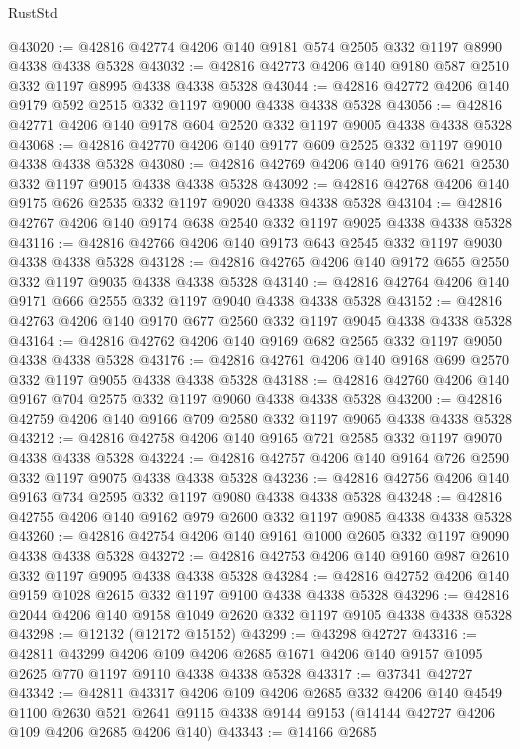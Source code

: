 \begin{lexlean}{RustStd}
\begin{coremodule}
{\begin{coremodule}
{{{{{{{{{{{{{{{{{{{{{{{{{{{{{{{{{{{{{{{{{{{{{{{{{{@43020 := @42816 @42774 @4206 @140 @9181 @574 @2505 @332 @1197 @8990 @4338 @4338 @5328
@43032 := @42816 @42773 @4206 @140 @9180 @587 @2510 @332 @1197 @8995 @4338 @4338 @5328
@43044 := @42816 @42772 @4206 @140 @9179 @592 @2515 @332 @1197 @9000 @4338 @4338 @5328
@43056 := @42816 @42771 @4206 @140 @9178 @604 @2520 @332 @1197 @9005 @4338 @4338 @5328
@43068 := @42816 @42770 @4206 @140 @9177 @609 @2525 @332 @1197 @9010 @4338 @4338 @5328
@43080 := @42816 @42769 @4206 @140 @9176 @621 @2530 @332 @1197 @9015 @4338 @4338 @5328
@43092 := @42816 @42768 @4206 @140 @9175 @626 @2535 @332 @1197 @9020 @4338 @4338 @5328
@43104 := @42816 @42767 @4206 @140 @9174 @638 @2540 @332 @1197 @9025 @4338 @4338 @5328
@43116 := @42816 @42766 @4206 @140 @9173 @643 @2545 @332 @1197 @9030 @4338 @4338 @5328
@43128 := @42816 @42765 @4206 @140 @9172 @655 @2550 @332 @1197 @9035 @4338 @4338 @5328
@43140 := @42816 @42764 @4206 @140 @9171 @666 @2555 @332 @1197 @9040 @4338 @4338 @5328
@43152 := @42816 @42763 @4206 @140 @9170 @677 @2560 @332 @1197 @9045 @4338 @4338 @5328
@43164 := @42816 @42762 @4206 @140 @9169 @682 @2565 @332 @1197 @9050 @4338 @4338 @5328
@43176 := @42816 @42761 @4206 @140 @9168 @699 @2570 @332 @1197 @9055 @4338 @4338 @5328
@43188 := @42816 @42760 @4206 @140 @9167 @704 @2575 @332 @1197 @9060 @4338 @4338 @5328
@43200 := @42816 @42759 @4206 @140 @9166 @709 @2580 @332 @1197 @9065 @4338 @4338 @5328
@43212 := @42816 @42758 @4206 @140 @9165 @721 @2585 @332 @1197 @9070 @4338 @4338 @5328
@43224 := @42816 @42757 @4206 @140 @9164 @726 @2590 @332 @1197 @9075 @4338 @4338 @5328
@43236 := @42816 @42756 @4206 @140 @9163 @734 @2595 @332 @1197 @9080 @4338 @4338 @5328
@43248 := @42816 @42755 @4206 @140 @9162 @979 @2600 @332 @1197 @9085 @4338 @4338 @5328
@43260 := @42816 @42754 @4206 @140 @9161 @1000 @2605 @332 @1197 @9090 @4338 @4338 @5328
@43272 := @42816 @42753 @4206 @140 @9160 @987 @2610 @332 @1197 @9095 @4338 @4338 @5328
@43284 := @42816 @42752 @4206 @140 @9159 @1028 @2615 @332 @1197 @9100 @4338 @4338 @5328
@43296 := @42816 @2044 @4206 @140 @9158 @1049 @2620 @332 @1197 @9105 @4338 @4338 @5328
@43298 := @12132 (@12172 @15152)
@43299 := @43298 @42727
@43316 := @42811
    @43299
    @4206
    @109
    @4206
    @2685
    @1671
    @4206
    @140
    @9157
    @1095
    @2625
    @770
    @1197
    @9110
    @4338
    @4338
    @5328
@43317 := @37341 @42727
@43342 := @42811
    @43317
    @4206
    @109
    @4206
    @2685
    @332
    @4206
    @140
    @4549
    @1100
    @2630
    @521
    @2641
    @9115
    @4338
    @9144
    @9153
    (@14144 @42727 @4206 @109 @4206 @2685 @4206 @140)
@43343 := @14166 @2685
}}}}}}}}}}}}}}}}}}}}}}}}}}}}}}}}}}}}}}}}}}}}}}}}}}
\end{coremodule}}
\end{coremodule}
\end{lexlean}

